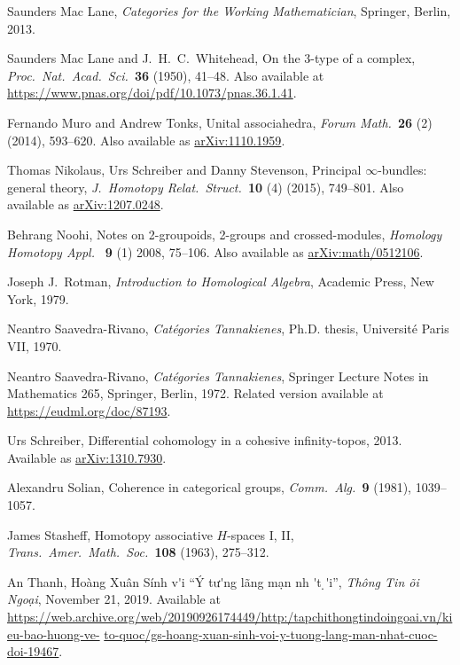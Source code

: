 \documentclass[reqno,12pt]{amsart}
\theoremstyle{definition}
\begin{document}
\begin{thebibliography}{99}
Saunders Mac Lane, \textsl{Categories for the Working Mathematician}, 
Springer, Berlin, 2013.

Saunders Mac Lane and J.\ H.\ C.\ Whitehead, On the
3-type of a complex, \textsl{Proc.\ Nat.\ Acad.\ Sci.\ }\textbf{36} (1950),
41--48.  Also available at \href{https://www.pnas.org/doi/pdf/10.1073/pnas.36.1.41}{https://www.pnas.org/doi/pdf/10.1073/pnas.36.1.41}.

Fernando Muro and Andrew Tonks, Unital associahedra, 
\textsl{Forum Math.\ }\textbf{26} (2) (2014), 593--620.  Also available
as \href{https://arxiv.org/abs/1110.1959}{arXiv:1110.1959}.

Thomas Nikolaus, Urs Schreiber and Danny Stevenson,
Principal $\infty$-bundles: general theory, \textsl{J.\ Homotopy Relat.\ Struct.\ }\textbf{10} (4) (2015), 749--801.  Also available as \href{https://arxiv.org/abs/1207.0248}{arXiv:1207.0248}.

Behrang Noohi, Notes on 2-groupoids, 2-groups and crossed-modules, 
\textsl{Homology Homotopy Appl.\ } \textbf{9} (1) 2008, 75--106.
Also available as \href{https://arxiv.org/abs/math/0512106}{ arXiv:math/0512106}.

Joseph J.\ Rotman, \textsl{Introduction to Homological Algebra},
Academic Press, New York, 1979.

Neantro Saavedra-Rivano, \textsl{Cat\'egories Tannakienes}, Ph.D. thesis, Universit\'e Paris VII, 1970.

Neantro Saavedra-Rivano, \textsl{Cat\'egories Tannakienes}, Springer Lecture Notes in Mathematics 265, Springer, Berlin, 1972.  Related version available at
\href{https://eudml.org/doc/87193}{https://eudml.org/doc/87193}.

Urs Schreiber, Differential cohomology in a cohesive infinity-topos, 2013.  Available as \href{https://arxiv.org/abs/1310.7930}{arXiv:1310.7930}.

Alexandru Solian, Coherence in categorical groups, \textsl{Comm.\ Alg.\ }\textbf{9} (1981), 1039--1057.

James Stasheff, Homotopy associative $H$-spaces I, II,
\textsl{Trans.\ Amer.\ Math.\ Soc.\ }\textbf{108} (1963), 275--312.

An Thanh, Ho\`ang Xu\^an S\'inh v{\selectfont \'\ohorn}i
``\'Y tư{\selectfont \'\ohorn}ng l\~ang m\d an nh{  \selectfont  \'\acircumflex t \d\ocircumflex \dj \'\ohorn}i'', 
\textsl{Th\^ong Tin \DJ\~{o}i Ngo\d ai}, November 21, 2019.  Available at
\href{https://web.archive.org/web/20190926174449/http:/tapchithongtindoingoai.vn/kieu-bao-huong-ve-to-quoc/gs-hoang-xuan-sinh-voi-y-tuong-lang-man-nhat-cuoc-doi-19467}{https://web.archive.org/web/20190926174449/http:/tapchithongtindoingoai.vn/kieu-bao-huong-ve-} \hfill \break \href{https://web.archive.org/web/20190926174449/http:/tapchithongtindoingoai.vn/kieu-bao-huong-ve-to-quoc/gs-hoang-xuan-sinh-voi-y-tuong-lang-man-nhat-cuoc-doi-19467}{to-quoc/gs-hoang-xuan-sinh-voi-y-tuong-lang-man-nhat-cuoc-doi-19467}.


\end{thebibliography}
\end{document}
